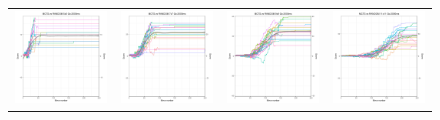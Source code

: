 \begin{figure}
\begin{tabular}{cccc}
\hspace{-0.5cm}\includegraphics[width = 1.55in]{images/Visualizations/MCTSvsRANDOM/2000ms5x5.png} &
\hspace{-0.5cm}\includegraphics[width = 1.55in]{images/Visualizations/MCTSvsRANDOM/2000ms7x7.png} &
\hspace{-0.5cm}\includegraphics[width = 1.55in]{images/Visualizations/MCTSvsRANDOM/2000ms9x9.png} &
\hspace{-0.5cm}\includegraphics[width = 1.55in]{images/Visualizations/MCTSvsRANDOM/2000ms11x11.png} \\


\end{tabular}
\end{figure}
